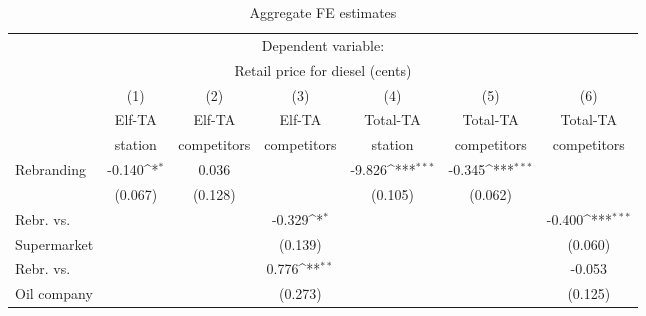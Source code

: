 \documentclass[11pt]{article}
\begin{document}
\begin{table}[h]
\centering
\def\sym#1{\ifmmode^{#1}\else\(^{#1}\)\fi}
\caption{Aggregate FE estimates}
\begin{tabular}{lcccccc}
\toprule
\toprule
\multicolumn{7}{c}{Dependent variable:}\\
\multicolumn{7}{c}{Retail price for diesel (cents)}\\
\hline
{}                      & (1)                            & (2)                        & (3)                           & (4)                              & (5)                               & (6)                   \\
{}                      & Elf-TA                        & Elf-TA                    & Elf-TA                      & Total-TA                       & Total-TA                      & Total-TA                   \\
{}                      & station                      & competitors          & competitors             & station                        & competitors                & competitors              \\
\hline
Rebranding       & -0.140\sym{*}         & 0.036                    &                                 & -9.826\sym{***}       & -0.345\sym{***}      &                                  \\
                         & (0.067)                     & (0.128)                  &                                & (0.105)                       & (0.062)                      &                                  \\
\hline
Rebr. vs.           &                                  &                               & -0.329\sym{*}      &                                    &                                     & -0.400\sym{***}     \\
Supermarket     &                                  &                               & (0.139)                  &                                    &                                     & (0.060)                    \\
\hline
Rebr. vs.           &                                  &                               & 0.776\sym{**}      &                                    &                                   & -0.053                        \\
Oil company      &                                  &                                & (0.273)                 &                                    &                                    &  (0.125)                      \\

\end{tabular}
\end{table}
\end{document}

